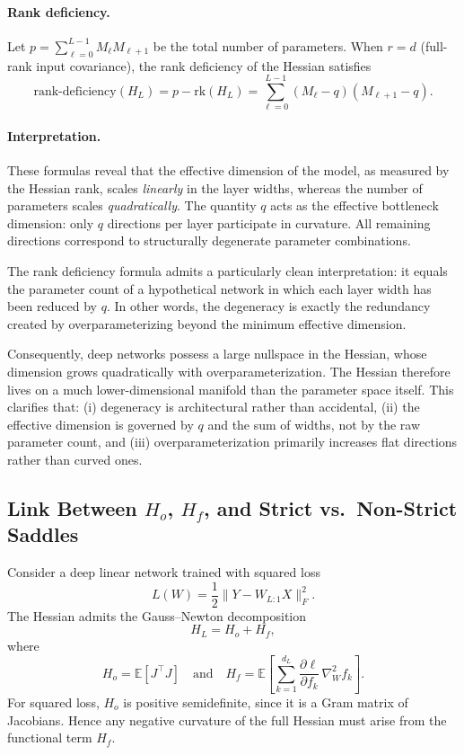 \documentclass{article}
\theoremstyle{definition}
\begin{document}
\paragraph{Rank deficiency.}
Let $p = \sum_{\ell=0}^{L-1} M_\ell M_{\ell+1}$ be the total number of parameters.
When $r = d$ (full-rank input covariance),
the rank deficiency of the Hessian satisfies
\[
\mathrm{rank\text{-}deficiency}(H_L)
=
p - \mathrm{rk}(H_L)
=
\sum_{\ell=0}^{L-1}
(M_\ell - q)(M_{\ell+1} - q).
\]

\paragraph{Interpretation.}
These formulas reveal that the effective dimension of the model,
as measured by the Hessian rank, scales \emph{linearly} in the layer widths,
whereas the number of parameters scales \emph{quadratically}.
The quantity $q$ acts as the effective bottleneck dimension:
only $q$ directions per layer participate in curvature.
All remaining directions correspond to structurally degenerate
parameter combinations.

The rank deficiency formula admits a particularly clean interpretation:
it equals the parameter count of a hypothetical network in which each
layer width has been reduced by $q$.
In other words, the degeneracy is exactly the redundancy created by
overparameterizing beyond the minimum effective dimension.

Consequently, deep networks possess a large nullspace in the Hessian,
whose dimension grows quadratically with overparameterization.
The Hessian therefore lives on a much lower-dimensional manifold than
the parameter space itself.
This clarifies that:
(i) degeneracy is architectural rather than accidental,
(ii) the effective dimension is governed by $q$ and the sum of widths,
not by the raw parameter count, and
(iii) overparameterization primarily increases flat directions rather
than curved ones.
\subsection{Link Between $H_o$, $H_f$, and Strict vs.\ Non-Strict Saddles}

Consider a deep linear network trained with squared loss
\[
L(W) = \frac12 \| Y - W_{L:1} X \|_F^2.
\]
The Hessian admits the Gauss--Newton decomposition
\[
H_L = H_o + H_f,
\]
where
\[
H_o = \mathbb{E}\!\left[ J^\top J \right]
\quad\text{and}\quad
H_f = \mathbb{E}\!\left[
\sum_{k=1}^{d_L}
\frac{\partial \ell}{\partial f_k}\,
\nabla^2_W f_k
\right].
\]
For squared loss, $H_o$ is positive semidefinite, since it is a Gram matrix of Jacobians. Hence any negative curvature of the full Hessian must arise from the functional term $H_f$.
\end{document}
